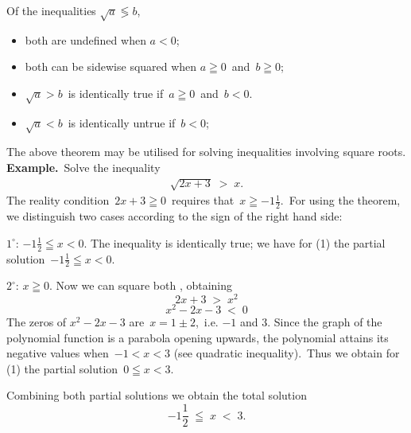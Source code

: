 \documentclass[12pt]{article}
\theoremstyle{definition}
\begin{document}
Of the inequalities \;$\sqrt{a} \lessgtr b$, 
\begin{itemize}
\item both are undefined when\; $a < 0$;
\item both can be sidewise squared when\; $a \geqq 0$\, and\, $b \geqq 0$;
\item $\sqrt{a} > b$\, is identically true if\, $a \geqq 0$\, and\, $b < 0$.
\item $\sqrt{a} < b$\, is identically untrue if\, $b < 0$;

\end{itemize}


The above theorem may be utilised for solving inequalities involving square roots.\\

\textbf{Example.}\, Solve the inequality
\begin{align}
\sqrt{2x+3} \;>\; x.
\end{align}
The reality condition\, $2x+3 \geqq 0$\, requires that\, $x \geqq -1\frac{1}{2}$.\, For using the theorem, we distinguish two cases according to the sign of the right hand side:

$1^\circ$:\; $-1\frac{1}{2} \leqq x < 0$.\; The inequality is identically true; we have for (1) the partial solution\, $-1\frac{1}{2} \leqq x < 0$.

$2^\circ$:\; $x \geqq 0$.\; Now we can square both , obtaining
$$2x+3 \;>\; x^2$$
$$x^2-2x-3 \;<\; 0$$
The zeros of $x^2\!-\!2x\!-\!3$ are\, $x = 1\pm2$,\, i.e. $-1$ and $3$. Since the graph of the polynomial function is a parabola opening upwards, the polynomial attains its negative values when\, $-1 < x < 3$ (see quadratic inequality).\, Thus we obtain for (1) the partial solution\, $0 \leqq x < 3$.

Combining both partial solutions we obtain the total solution
$$-1\frac{1}{2} \;\leqq\; x \;<\; 3.$$


\end{document}
